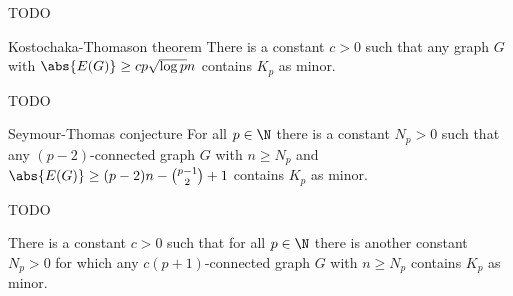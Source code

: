 \documentclass[a4paper, 12pt]{report}
\begin{document}
    TODO 

    \begin{framedthm}{Kostochaka-Thomason theorem}
        There is a constant $c > 0$ such that any graph $G$ with $\abs{E(G)} \ge cp \sqrt{\log p}n$ contains $K_p$ as minor.
    \end{framedthm}

    TODO 

    \begin{framedconj}{Seymour-Thomas conjecture}
        For all $p \in \N$ there is a constant $N_p > 0$ such that any $(p - 2)$-connected graph $G$ with $n \ge N_p$ and $\abs{E(G)} \ge (p - 2)n - \binom{p - 1}{2} + 1$ contains $K_p$ as minor.
    \end{framedconj}

    TODO 

    \begin{framedthm}{}
        There is a constant $c > 0$ such that for all $p \in \N$ there is another constant $N_p > 0$ for which any $c(p + 1)$-connected graph $G$ with $n \ge N_p$ contains $K_p$ as minor.
    \end{framedthm}

    \printbibliography %
\end{document}
